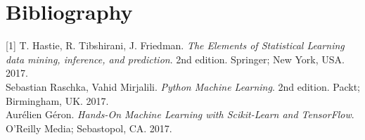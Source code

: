 \section{Bibliography}
\label{chap:Bibliography}

\label{Bib:TheElementsOfStatisticalLearningDataMining}[1] T. Hastie, R. Tibshirani, J. Friedman. \textit{The Elements of Statistical Learning data mining, inference, and prediction}. 2nd edition. Springer; New York, USA. 2017.\\

\label{Bib:PythonMachineLearning}\noindent [2] Sebastian Raschka, Vahid Mirjalili. \textit{Python Machine Learning}. 2nd edition. Packt; Birmingham, UK. 2017.\\

\label{Bib:PythonMachineLearning}\noindent [3] Aurélien Géron. \textit{Hands-On Machine Learning with Scikit-Learn and TensorFlow}. O'Reilly Media; Sebastopol, CA. 2017.\\
